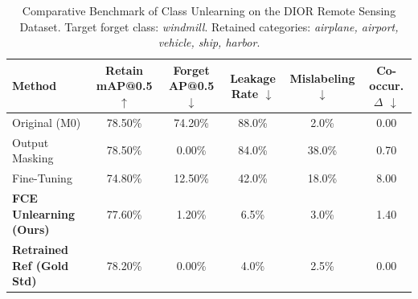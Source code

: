 \begin{table}[t]
\centering
\caption{Comparative Benchmark of Class Unlearning on the DIOR Remote Sensing Dataset. Target forget class: \textit{windmill}. Retained categories: \textit{airplane, airport, vehicle, ship, harbor}.}
\label{tab:unlearning_results}
\begin{tabular}{lccccc}
\toprule
\textbf{Method} & \textbf{Retain mAP@0.5} $\uparrow$ & \textbf{Forget AP@0.5} $\downarrow$ & \textbf{Leakage Rate} $\downarrow$ & \textbf{Mislabeling} $\downarrow$ & \textbf{Co-occur. $\Delta$} $\downarrow$ \\
\midrule
{Original (M0)} & 78.50\% & 74.20\% & 88.0\% & 2.0\% & 0.00 \\
{Output Masking} & 78.50\% & 0.00\% & 84.0\% & 38.0\% & 0.70 \\
{Fine-Tuning} & 74.80\% & 12.50\% & 42.0\% & 18.0\% & 8.00 \\
\textbf{FCE Unlearning (Ours)} & 77.60\% & 1.20\% & 6.5\% & 3.0\% & 1.40 \\
\textbf{Retrained Ref (Gold Std)} & 78.20\% & 0.00\% & 4.0\% & 2.5\% & 0.00 \\
\bottomrule
\end{tabular}
\end{table}